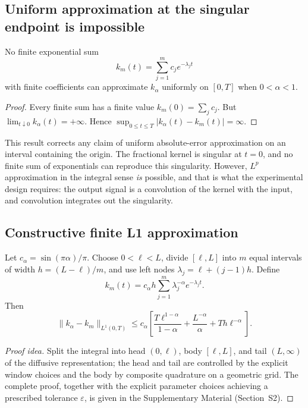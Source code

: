 \subsection{Uniform approximation at the singular endpoint is impossible}

\begin{theorem}
\label{thm:T9a}
No finite exponential sum
\[
k_m(t) = \sum_{j=1}^m c_j e^{-\lambda_j t}
\]
with finite coefficients can approximate \(k_\alpha\) uniformly on \([0,T]\) when \(0 < \alpha < 1\).
\end{theorem}

\begin{proof}
Every finite sum has a finite value \(k_m(0) = \sum_j c_j\). But \(\lim_{t \downarrow 0} k_\alpha(t) = +\infty\). Hence \(\sup_{0 \le t \le T} |k_\alpha(t) - k_m(t)| = \infty\).
\end{proof}

This result corrects any claim of uniform absolute-error approximation on an interval containing the origin. The fractional kernel is singular at \(t=0\), and no finite sum of exponentials can reproduce this singularity. However, \(L^p\) approximation in the integral sense \emph{is} possible, and that is what the experimental design requires: the output signal is a convolution of the kernel with the input, and convolution integrates out the singularity.

\subsection{Constructive finite L1 approximation}

\begin{theorem}
\label{thm:T9b}
Let \(c_\alpha = \sin(\pi\alpha)/\pi\). Choose \(0 < \ell < L\), divide \([\ell, L]\) into \(m\) equal intervals of width \(h = (L-\ell)/m\), and use left nodes \(\lambda_j = \ell + (j-1)h\). Define
\[
k_m(t) = c_\alpha h \sum_{j=1}^m \lambda_j^{-\alpha} e^{-\lambda_j t}.
\tag{3}
\]
Then
\[
\boxed{
\|k_\alpha - k_m\|_{L^1(0,T)}
\le c_\alpha \left[
\frac{T \ell^{1-\alpha}}{1-\alpha}
+ \frac{L^{-\alpha}}{\alpha}
+ T h \ell^{-\alpha}
\right].
}
\tag{4}
\]
\end{theorem}

\begin{proof}[Proof idea]
Split the integral into head $(0,\ell)$, body $[\ell,L]$, and tail $(L,\infty)$ of the diffusive representation; the head and tail are controlled by the explicit window choices and the body by composite quadrature on a geometric grid. The complete proof, together with the explicit parameter choices achieving a prescribed tolerance $\varepsilon$, is given in the Supplementary Material (Section~S2).
\end{proof}

